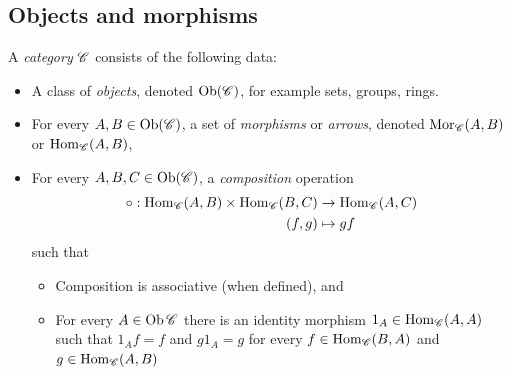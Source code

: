\subsection{Objects and morphisms}

\begin{definition}[Category]
	A \emph{category} $\mathscr{C}$ consists of the following data:
	\begin{itemize}
		\item A class of \emph{objects}, denoted $\operatorname{Ob} (\mathscr{C})$, for example sets, groups, rings.
		\item For every $A, B \in \operatorname{Ob} (\mathscr{C})$, a set of \emph{morphisms} or \emph{arrows}, denoted $\operatorname{Mor}_{\mathscr{C}} (A, B)$ or $\operatorname{Hom}_{\mathscr{C}} (A,B)$, 
		\item For every $A, B, C \in \operatorname{Ob} (\mathscr{C})$, a \emph{composition} operation 
		\begin{align*}
			\circ: \operatorname{Hom}_{\mathscr{C}} (A,B) \times \operatorname{Hom}_{\mathscr{C}} (B,C) & \to \operatorname{Hom}_{\mathscr{C}} (A,C) \\
			(f, g) & \mapsto gf
		\end{align*}
		such that
		\begin{itemize}
			\item Composition is associative (when defined), and 
			\item For every $A \in \operatorname{Ob}{\mathscr{C}}$ there is an identity morphism $1_A \in \operatorname{Hom}_{\mathscr{C}} (A,A)$ such that $1_A f = f$ and $g 1_A = g$ for every $f \in \operatorname{Hom}_{\mathscr{C}} (B,A)$ and $g \in \operatorname{Hom}_{\mathscr{C}} (A,B)$
		\end{itemize}
	\end{itemize}
\end{definition}




